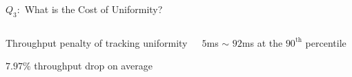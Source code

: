 \begin{frame}{$Q_{3}:$ What is the Cost of Uniformity?}
  \begin{columns}
    \begin{center}
      \vspace{-0.20cm}
      {\footnotesize Throughput penalty of tracking uniformity}

      \vspace{0.30cm}
      $7.97\%$ throughput drop on average
    \end{center}
    \pause
    \begin{center}

      \vspace{0.30cm}
      $5$ms $\sim$ $92$ms at the $90^{\text{th}}$ percentile
    \end{center}
  \end{columns}
\end{frame}
